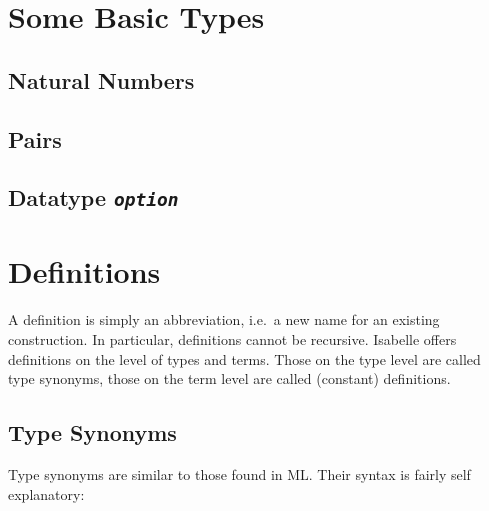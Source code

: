 \begin{exercise}\label{ex:Tree}
%
\end{exercise}





\section{Some Basic Types}


\subsection{Natural Numbers}
\label{sec:nat}






\subsection{Pairs}


\subsection{Datatype {\tt\slshape option}}
\label{sec:option}


\section{Definitions}
\label{sec:Definitions}

A definition is simply an abbreviation, i.e.\ a new name for an existing
construction. In particular, definitions cannot be recursive. Isabelle offers
definitions on the level of types and terms. Those on the type level are
called type synonyms, those on the term level are called (constant)
definitions.


\subsection{Type Synonyms}

Type synonyms are similar to those found in ML\@. Their syntax is fairly self
explanatory:

%

